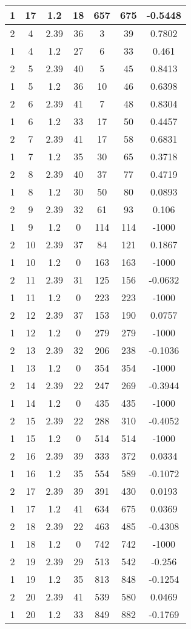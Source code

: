 \documentclass[letterpaper, 12pt]{article}
\begin{document}
\begin{longtable}{|c|c|c|c|c|c|c|}
\hline
1 & 17 & 1.2 & 18 & 657 & 675 & -0.5448 \\
\hline
2 & 4 & 2.39 & 36 & 3 & 39 & 0.7802 \\
\hline
1 & 4 & 1.2 & 27 & 6 & 33 & 0.461 \\
\hline
2 & 5 & 2.39 & 40 & 5 & 45 & 0.8413 \\
\hline
1 & 5 & 1.2 & 36 & 10 & 46 & 0.6398 \\
\hline
2 & 6 & 2.39 & 41 & 7 & 48 & 0.8304 \\
\hline
1 & 6 & 1.2 & 33 & 17 & 50 & 0.4457 \\
\hline
2 & 7 & 2.39 & 41 & 17 & 58 & 0.6831 \\
\hline
1 & 7 & 1.2 & 35 & 30 & 65 & 0.3718 \\
\hline
2 & 8 & 2.39 & 40 & 37 & 77 & 0.4719 \\
\hline
1 & 8 & 1.2 & 30 & 50 & 80 & 0.0893 \\
\hline
2 & 9 & 2.39 & 32 & 61 & 93 & 0.106 \\
\hline
1 & 9 & 1.2 & 0 & 114 & 114 & -1000 \\
\hline
2 & 10 & 2.39 & 37 & 84 & 121 & 0.1867 \\
\hline
1 & 10 & 1.2 & 0 & 163 & 163 & -1000 \\
\hline
2 & 11 & 2.39 & 31 & 125 & 156 & -0.0632 \\
\hline
1 & 11 & 1.2 & 0 & 223 & 223 & -1000 \\
\hline
2 & 12 & 2.39 & 37 & 153 & 190 & 0.0757 \\
\hline
1 & 12 & 1.2 & 0 & 279 & 279 & -1000 \\
\hline
2 & 13 & 2.39 & 32 & 206 & 238 & -0.1036 \\
\hline
1 & 13 & 1.2 & 0 & 354 & 354 & -1000 \\
\hline
2 & 14 & 2.39 & 22 & 247 & 269 & -0.3944 \\
\hline
1 & 14 & 1.2 & 0 & 435 & 435 & -1000 \\
\hline
2 & 15 & 2.39 & 22 & 288 & 310 & -0.4052 \\
\hline
1 & 15 & 1.2 & 0 & 514 & 514 & -1000 \\
\hline
2 & 16 & 2.39 & 39 & 333 & 372 & 0.0334 \\
\hline
1 & 16 & 1.2 & 35 & 554 & 589 & -0.1072 \\
\hline
2 & 17 & 2.39 & 39 & 391 & 430 & 0.0193 \\
\hline
1 & 17 & 1.2 & 41 & 634 & 675 & 0.0369 \\
\hline
2 & 18 & 2.39 & 22 & 463 & 485 & -0.4308 \\
\hline
1 & 18 & 1.2 & 0 & 742 & 742 & -1000 \\
\hline
2 & 19 & 2.39 & 29 & 513 & 542 & -0.256 \\
\hline
1 & 19 & 1.2 & 35 & 813 & 848 & -0.1254 \\
\hline
2 & 20 & 2.39 & 41 & 539 & 580 & 0.0469 \\
\hline
1 & 20 & 1.2 & 33 & 849 & 882 & -0.1769 \\
\hline
\end{longtable}
\end{document}
